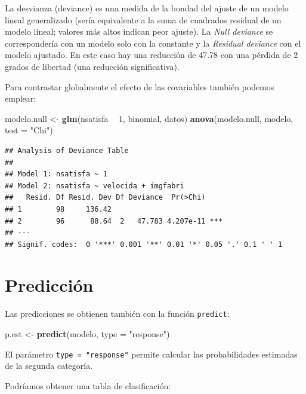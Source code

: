 \documentclass[]{book}
\newenvironment{Shaded}{\begin{snugshade}}{\end{snugshade}}
\newcommand{\DataTypeTok}[1]{\textcolor[rgb]{0.13,0.29,0.53}{#1}}
\newcommand{\DecValTok}[1]{\textcolor[rgb]{0.00,0.00,0.81}{#1}}
\newcommand{\KeywordTok}[1]{\textcolor[rgb]{0.13,0.29,0.53}{\textbf{#1}}}
\newcommand{\NormalTok}[1]{#1}
\newcommand{\OperatorTok}[1]{\textcolor[rgb]{0.81,0.36,0.00}{\textbf{#1}}}
\newcommand{\StringTok}[1]{\textcolor[rgb]{0.31,0.60,0.02}{#1}}
\begin{document}
La desvianza (deviance) es una medida de la bondad del ajuste de un modelo lineal generalizado (sería equivalente a la suma de cuadrados residual de un modelo lineal; valores más altos indican peor ajuste). La \emph{Null deviance} se correspondería con un modelo solo con la constante y la \emph{Residual deviance} con el modelo ajustado.
En este caso hay una reducción de 47.78 con una pérdida de 2 grados de libertad (una reducción significativa).

Para contrastar globalmente el efecto de las covariables también podemos emplear:

\begin{Shaded}
\begin{Highlighting}[]
\NormalTok{modelo.null <-}\StringTok{ }\KeywordTok{glm}\NormalTok{(nsatisfa }\OperatorTok{~}\StringTok{ }\DecValTok{1}\NormalTok{, binomial, datos)}
\KeywordTok{anova}\NormalTok{(modelo.null, modelo, }\DataTypeTok{test =} \StringTok{"Chi"}\NormalTok{)}
\end{Highlighting}
\end{Shaded}

\begin{verbatim}
## Analysis of Deviance Table
## 
## Model 1: nsatisfa ~ 1
## Model 2: nsatisfa ~ velocida + imgfabri
##   Resid. Df Resid. Dev Df Deviance  Pr(>Chi)    
## 1        98     136.42                          
## 2        96      88.64  2   47.783 4.207e-11 ***
## ---
## Signif. codes:  0 '***' 0.001 '**' 0.01 '*' 0.05 '.' 0.1 ' ' 1
\end{verbatim}

\hypertarget{prediccion-1}{%
\section{Predicción}\label{prediccion-1}}

Las predicciones se obtienen también con la función \texttt{predict}:

\begin{Shaded}
\begin{Highlighting}[]
\NormalTok{p.est <-}\StringTok{ }\KeywordTok{predict}\NormalTok{(modelo, }\DataTypeTok{type =} \StringTok{"response"}\NormalTok{)}
\end{Highlighting}
\end{Shaded}

El parámetro \texttt{type\ =\ "response"} permite calcular las probabilidades estimadas de la segunda categoría.

Podríamos obtener una tabla de clasificación:
\end{document}
